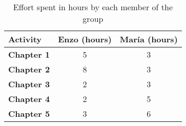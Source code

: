 \begin{table}[H]
    \centering 
    \begin{tabular}{|p{5em} c c |}
    \hline
    \rowcolor{bluepoli!40} %
    \textbf{Activity} & \textbf{Enzo (hours)} & \textbf{María (hours)} \T\B \\
    \hline \hline
    \textbf{Chapter 1} & 5 & 3  \T\B \\
    \textbf{Chapter 2} & 8 & 3  \T\B\\
    \textbf{Chapter 3} & 2 & 3  \B\\
    \textbf{Chapter 4} & 2 & 5  \B\\
    \textbf{Chapter 5} & 3 & 6  \B\\
    \hline
    \end{tabular}
    \\[10pt]
    \caption{Effort spent in hours by each member of the group}
    \label{table:effort_spent}
\end{table}